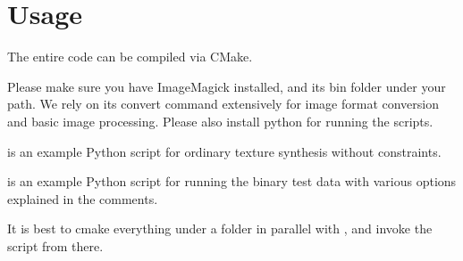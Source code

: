 \section{Usage}
\label{sec:interface}

The entire code can be compiled via CMake.

Please make sure you have ImageMagick installed, and its bin folder under your path.
We rely on its convert command extensively for image format conversion and basic image processing.
Please also install python for running the scripts.

 is an example Python script for ordinary texture synthesis without constraints.

 is an example Python script for running the binary test data with various options explained in the comments.

It is best to cmake everything under a  folder in parallel with , and invoke the script from there.

